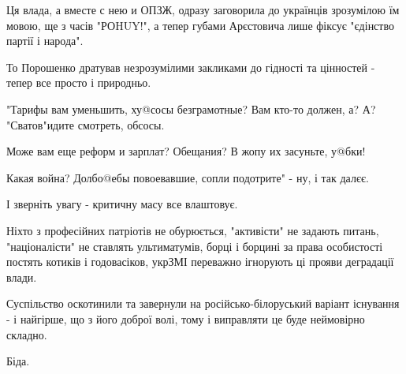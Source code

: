 \begin{itemize}
 

Ця влада, а вместе с нею и ОПЗЖ, одразу заговорила до українців зрозумілою їм
мовою, ще з часів "РОHUY!", а тепер губами Арєстовича лише фіксує "єдінство
партії і народа".

То Порошенко дратував незрозумілими закликами до гідності та цінностей - тепер
все просто і природньо.

"Тарифы вам уменьшить, ху@сосы безграмотные? Вам кто-то должен, а? А?
"Сватов"идите смотреть, обсосы.

Може вам еще реформ и зарплат? Обещания? В жопу их засуньте, у@бки!

Какая война? Долбо@ебы повоевавшие, сопли подотрите" - ну, і так далєє.

І зверніть увагу - критичну масу все влаштовує.

Ніхто з професійних патріотів не обурюється, "активісти" не задають питань,
"націоналісти" не ставлять ультиматумів, борці і борцині за права особистості
постять котиків і годовасіков, укрЗМІ переважно ігнорують ці прояви деградації
влади.

Суспільство оскотинили та завернули на російсько-білоруський варіант існування
- і найгірше, що з його доброї волі, тому і виправляти це буде неймовірно
складно.

Біда.

\end{itemize}

